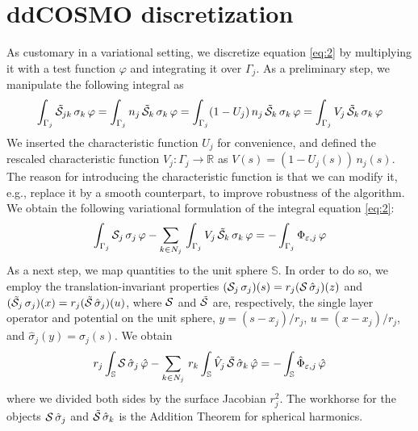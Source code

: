 \section{ddCOSMO discretization \label{app:cosmo}}
As customary in a variational setting, we discretize equation \eqref{eq:2} by multiplying it with a test function $\varphi$ and integrating it over $\Gamma_j$. As a preliminary step, we manipulate the following integral as
\[
\int_{\Gamma_j} \tilde{\mathcal{S}}_{jk} \, \sigma_k \, \varphi =\int_{\Gamma_j} n_j \, \tilde{\mathcal{S}}_{k} \, \sigma_k \, \varphi = \int_{\Gamma_j} (1 - U_j ) \,n_j \, \tilde{\mathcal{S}}_{k} \, \sigma_k \, \varphi = \int_{\Gamma_j} V_j \, \tilde{\mathcal{S}}_{k} \, \sigma_k \, \varphi
\]
We inserted the characteristic function $U_j$ for convenience, and defined the rescaled characteristic function $V_j : \Gamma_j \to \mathbb{R}$ as $V(s) = (1 - U_j(s)) \, n_j(s)$. The reason for introducing the characteristic function is that we can modify it, e.g., replace it by a smooth counterpart, to improve robustness of the algorithm. We obtain the following variational formulation of the integral equation \eqref{eq:2}:
\[
\int_{\Gamma_j} \cS_j \, \sigma_j \, \varphi - \sum_{k \in N_j} \, \int_{\Gamma_j} V_j \, \tilde{\cS}_{k} \, \sigma_k \, \varphi= -\int_{\Gamma_j}  \Phi_{\varepsilon,j} \, \varphi %
\]
As a next step, we map quantities to the unit sphere $\mathbb{S}$. In order to do so, we employ the translation-invariant properties $(\mathcal{S}_j \, \sigma_j)(s) = r_j( \mathcal{S} \, \hat{\sigma}_j)(z)$ and $(\tilde{\mathcal{S}}_j \, \sigma_j)(x) = r_j( \tilde{\mathcal{S}} \, \hat{\sigma}_j)(u)$, where $\mathcal{S}$ and $\tilde{\mathcal{S}}$ are, respectively, the single layer operator and potential on the unit sphere, $y = (s - x_j)/r_j$, $u = (x - x_j)/r_j$, and $\hat{\sigma}_j(y) = \sigma_j(s)$. We obtain
\begin{equation}\label{eq:50}
r_j \int_{\mathbb{S}} \mathcal{S} \, \hat{\sigma}_j \, \hat{\varphi} - \sum_{k \in N_j} \, r_k  \int_{\mathbb{S}} \hat{V}_j \, \tilde{\mathcal{S}} \, \hat{\sigma}_k \, \hat{\varphi}= -\int_{\mathbb{S}}  \hat{\Phi}_{\varepsilon,j} \, \hat{\varphi}
\end{equation}
where we divided both sides by the surface Jacobian $r_j^2$. The workhorse for the objects $\mathcal{S} \, \hat{\sigma}_j$ and $\tilde{\mathcal{S}} \, \hat{\sigma}_k$ is the Addition Theorem for spherical harmonics.

